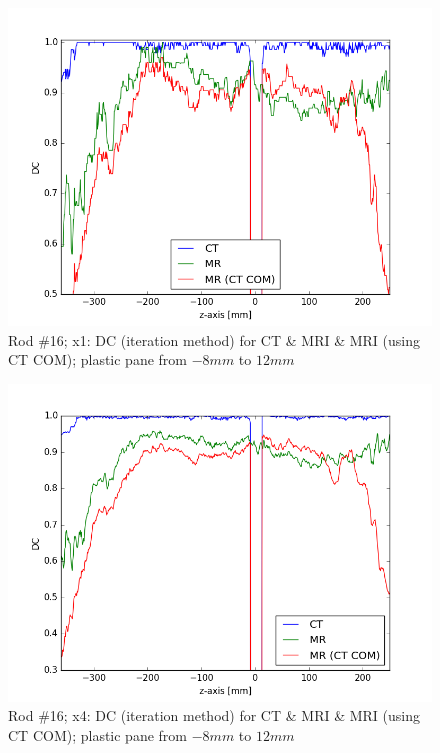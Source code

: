 \begin{figure}[!tbh]
    \centering
    \includegraphics[scale=0.6]{../fig/python/ph3_v2/dice/ph3_MR_v2_x1_DC_iter.png}
    \caption{Rod \#16; x1: DC (iteration method) for CT \& MRI \& MRI (using CT COM); plastic pane from $-8mm$ to $12mm$}
    \label{fig:ph3_DC_x1}
\end{figure}

\begin{figure}[!tbh]
    \centering
    \includegraphics[scale=0.6]{../fig/python/ph3_v2/dice/ph3_MR_v2_x4_DC_iter.png}
    \caption{Rod \#16; x4: DC (iteration method) for CT \& MRI \& MRI (using CT COM); plastic pane from $-8mm$ to $12mm$}
    \label{fig:ph3_DC_x4}
\end{figure}